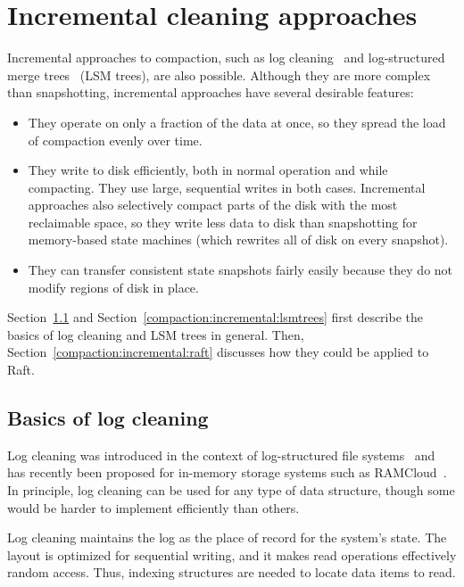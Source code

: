 \section{Incremental cleaning approaches}
\label{compaction:incremental}

Incremental approaches to compaction, such as log
cleaning~\cite{Rosenblum:1992,Rumble:2014} and log-structured merge
trees~\cite{ONeil:1996,Chang:2006} (LSM trees), are also possible.
Although they are more complex than snapshotting, incremental
approaches have several desirable features:
%
\begin{itemize}
%
\item They operate on only a fraction of the data at once, so they
spread the load of compaction evenly over time.
%
\item They write to disk efficiently, both in normal operation and
while compacting. They use large, sequential writes in both cases.
Incremental approaches also selectively compact parts of the disk
with the most reclaimable space, so they write less data to disk than
snapshotting for memory-based state machines (which rewrites all of disk
on every snapshot).
%
\item They can transfer consistent state snapshots fairly easily
because they do not modify regions of disk in place.
%
\end{itemize}
%
Section~\ref{compaction:incremental:cleaning} and
Section~\ref{compaction:incremental:lsmtrees}
first describe the basics of log cleaning and LSM trees in
general. Then, Section~\ref{compaction:incremental:raft}
discusses how they could be applied to Raft.

\subsection{Basics of log cleaning}
\label{compaction:incremental:cleaning}

Log cleaning was introduced in the context of log-structured file
systems~\cite{Rosenblum:1992} and has recently been proposed for
in-memory storage systems such as RAMCloud~\cite{Rumble:2014}.
In principle, log cleaning can be used for any type of data structure,
though some would be harder to implement efficiently than others.

Log cleaning maintains the log as the place of record for the system's
state. The layout is optimized for sequential writing, and it makes read
operations effectively random access. Thus, indexing structures are
needed to locate data items to read.

